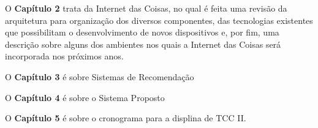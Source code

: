 O \textbf{Capítulo 2} trata da Internet das Coisas, no qual é feita uma revisão da arquitetura para organização dos diversos componentes, das tecnologias existentes que possibilitam o desenvolvimento de novos dispositivos e, por fim, uma descrição sobre alguns dos ambientes nos quais a Internet das Coisas será incorporada nos próximos anos.

O \textbf{Capítulo 3} é sobre Sistemas de Recomendação

O \textbf{Capítulo 4} é sobre o Sistema Proposto

O \textbf{Capítulo 5} é sobre o cronograma para a displina de TCC II.

	

